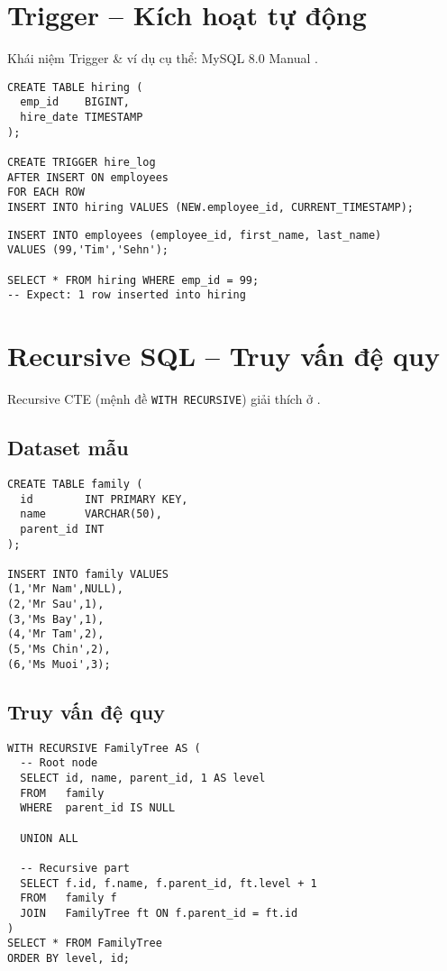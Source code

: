 \section{Trigger – Kích hoạt tự động}

Khái niệm Trigger \& ví dụ cụ thể: MySQL 8.0 Manual \cite{mysql_manual}.

\begin{lstlisting}[caption={Trigger ghi nhận nhân viên mới}]
CREATE TABLE hiring (
  emp_id    BIGINT,
  hire_date TIMESTAMP
);

CREATE TRIGGER hire_log
AFTER INSERT ON employees
FOR EACH ROW
INSERT INTO hiring VALUES (NEW.employee_id, CURRENT_TIMESTAMP);
\end{lstlisting}

\begin{lstlisting}[caption={Kiểm thử trigger}]
INSERT INTO employees (employee_id, first_name, last_name)
VALUES (99,'Tim','Sehn');

SELECT * FROM hiring WHERE emp_id = 99;
-- Expect: 1 row inserted into hiring
\end{lstlisting}

\section{Recursive SQL – Truy vấn đệ quy}

Recursive CTE (mệnh đề \texttt{WITH RECURSIVE}) giải thích ở \cite{postgresql_docs}.

\subsection{Dataset mẫu}

\begin{lstlisting}[caption={Tạo bảng family mẫu}]
CREATE TABLE family (
  id        INT PRIMARY KEY,
  name      VARCHAR(50),
  parent_id INT
);

INSERT INTO family VALUES
(1,'Mr Nam',NULL),
(2,'Mr Sau',1),
(3,'Ms Bay',1),
(4,'Mr Tam',2),
(5,'Ms Chin',2),
(6,'Ms Muoi',3);
\end{lstlisting}

\subsection{Truy vấn đệ quy}

\begin{lstlisting}[caption={Recursive CTE cho cây gia phả}]
WITH RECURSIVE FamilyTree AS (
  -- Root node
  SELECT id, name, parent_id, 1 AS level
  FROM   family
  WHERE  parent_id IS NULL

  UNION ALL

  -- Recursive part
  SELECT f.id, f.name, f.parent_id, ft.level + 1
  FROM   family f
  JOIN   FamilyTree ft ON f.parent_id = ft.id
)
SELECT * FROM FamilyTree
ORDER BY level, id;
\end{lstlisting}

